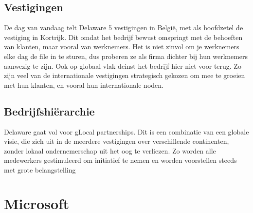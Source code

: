 \subsection{Vestigingen}
De dag van vandaag telt Delaware 5 vestigingen in België, met als hoofdzetel de vestiging in Kortrijk. Dit omdat het bedrijf bewust omspringt met de behoeften van klanten, maar vooral van werknemers. Het is niet zinvol om je werknemers elke dag de file in te sturen, dus proberen ze als firma dichter bij hun werknemers aanwezig te zijn. 
Ook op globaal vlak deinst het bedrijf hier niet voor terug. Zo zijn veel van de internationale vestigingen strategisch gekozen om mee te groeien met hun klanten, en vooral hun internationale noden. 

\subsection{Bedrijfshiërarchie }
Delaware gaat vol voor gLocal partnerships. Dit is een combinatie van een globale visie, die zich uit in de meerdere vestigingen over verschillende continenten, zonder lokaal ondernemerschap uit het oog te verliezen. Zo worden alle medewerkers gestimuleerd om initiatief te nemen en worden voorstellen steeds met grote belangstelling 

\section{Microsoft}
